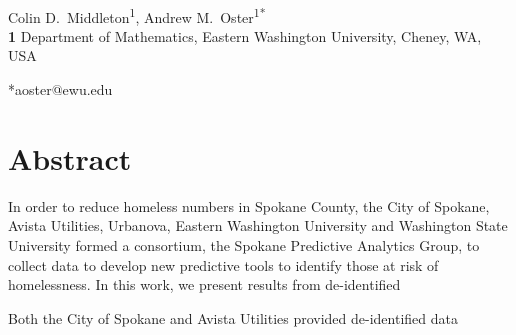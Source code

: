 \documentclass[10pt,letterpaper]{article}
\begin{document}
\vspace*{0.2in}

\begin{flushleft}
{\Large
\textbf{} %
}
\newline
\\
Colin D.\ Middleton\textsuperscript{1},
Andrew M.\ Oster\textsuperscript{1*} \\
\bigskip
\textbf{1} Department of Mathematics, Eastern Washington University, Cheney, WA, USA
\\

\bigskip





*aoster@ewu.edu

\end{flushleft}
\section*{Abstract}
In order to reduce homeless numbers in Spokane County, the City of Spokane, Avista Utilities, Urbanova, Eastern Washington University and Washington State University formed a consortium, the Spokane Predictive Analytics Group, to collect data to develop new predictive tools to identify those at risk of homelessness.  In this work, we present results from de-identified 


Both the City of Spokane and Avista Utilities provided de-identified data 


\end{document}
